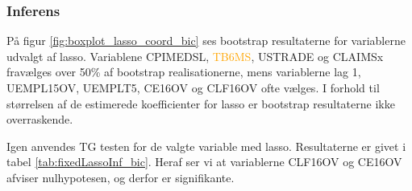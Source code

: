 \subsubsection{Inferens}
På figur \ref{fig:boxplot_lasso_coord_bic} ses bootstrap resultaterne for variablerne udvalgt af lasso.
Variablene \textcolor{cadetblue2}{CPIMEDSL}, \textcolor{orange}{TB6MS}, \textcolor{blue3}{USTRADE} og \textcolor{blue3}{CLAIMSx} fravælges over 50\% af bootstrap realisationerne, mens variablerne \textcolor{blue3}{lag 1}, \textcolor{blue3}{UEMPL15OV}, \textcolor{blue3}{UEMPLT5}, \textcolor{blue3}{CE16OV} og \textcolor{blue3}{CLF16OV} ofte vælges.
I forhold til størrelsen af de estimerede koefficienter for lasso er bootstrap resultaterne ikke overraskende. 
%
%

Igen anvendes TG testen for de valgte variable med lasso.
Resultaterne er givet i tabel \ref{tab:fixedLassoInf_bic}.
Heraf ser vi at variablerne \textcolor{blue3}{CLF16OV} og \textcolor{blue3}{CE16OV} afviser nulhypotesen, og derfor er signifikante.






